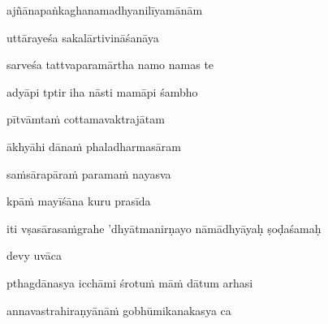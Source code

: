 \ujvers\nemsloka 
ajñānapaṅkaghanamadhyanilīyamānām
\dontdisplaylinenum

\nemslokab 
uttārayeśa sakalārtivināśanāya \danda\dontdisplaylinenum

\nemslokac 
sarveśa tattvaparamārtha namo namas te
\dontdisplaylinenum

\nemslokad 
adyāpi tptir iha nāsti mamāpi śambho \veg\dontdisplaylinenum
{}

\ujvers\nemsloka 
pītvāmtaṁ cottamavaktrajātam
\dontdisplaylinenum

\nemslokab 
ākhyāhi dānaṁ phaladharmasāram \danda\dontdisplaylinenum

\nemslokac 
saṁsārapāraṁ paramaṁ nayasva
\dontdisplaylinenum

\nemslokad 
kpāṁ mayīśāna kuru prasīda \veg\dontdisplaylinenum

\vers


\jump
\begin{center}
\ketdanda iti vṣasārasaṁgrahe 'dhyātmanirṇayo nāmādhyāyaḥ ṣoḍaśamaḥ\ketdanda
\end{center}
\dontdisplaylinenum\vers 

\vers
{}
\bekveg\szamveg\vfill\phpspagebreak\szam\bek{}
\thispagestyle{empty}



\jump\jump
\vers

devy uvāca~{\dandab}\dontdisplaylinenum 

pthagdānasya icchāmi śrotuṁ māṁ dātum arhasi\thinspace{\danda} \dontdisplaylinenum

annavastrahiraṇyānāṁ gobhūmikanakasya ca \veg\dontdisplaylinenum
{}

